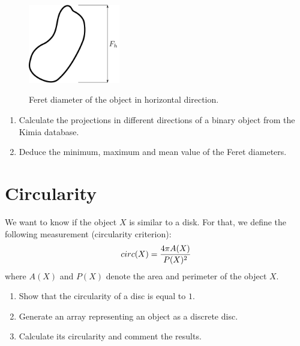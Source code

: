 \vspace*{-10pt}

\begin{figure}[H]
 \centering\caption{Feret diameter of the object in horizontal direction.}%
 \includegraphics[width=4cm]{feret_diameter.pdf}%
 \label{tut:image_characterization:enonce:feret_diameter}%
\end{figure}

\vspace*{-10pt}

\begin{qbox}
\begin{enumerate}
	\item Calculate the projections in different directions of a binary object from the Kimia database.
	\item Deduce the minimum, maximum and mean value of the Feret diameters.
\end{enumerate}
\end{qbox}

\vspace*{-8pt}

\section{Circularity}\vspace*{-8pt}
We want to know if the object $X$ is similar to a disk. For that, we define the following measurement (circularity criterion):\vspace*{-10pt}
\[
circ(X)=\frac{4\pi A(X)}{P(X)^2}
\vspace*{-8pt}\]
where $A(X)$ and $P(X)$ denote the area and perimeter of the object $X$.

\begin{qbox}
\begin{enumerate}
	\item Show that the circularity of a disc is equal to $1$.
	\item Generate an array representing an object as a discrete disc. 
	\item Calculate its circularity and comment the results.
\end{enumerate}
\end{qbox}


